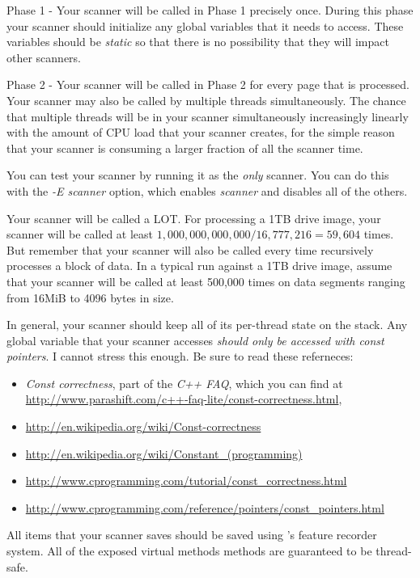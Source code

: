 Phase 1 - Your scanner will be called in Phase 1 precisely
once. During this phase your scanner should initialize any global
variables that it needs to access. These variables should be
\emph{static} so that there is no possibility that they will impact
other scanners.

Phase 2 - Your scanner will be called in Phase 2 for every page that
is processed. Your scanner may also be called by multiple threads
simultaneously. The chance that multiple
threads will be in your scanner simultaneously increasingly linearly
with the amount of CPU load that your scanner creates, for the simple
reason that your scanner is consuming a larger fraction of all the
scanner time. 

You can test your scanner by running it as the \emph{only}
scanner. You can do this with the \emph{-E scanner} option, which
enables \emph{scanner} and disables all of the others.

Your scanner will be called a LOT. For processing a 1TB drive image,
your scanner will be called at least $1,000,000,000,000 / 16,777,216 =
59,604$ times. But remember that your scanner will also be called
every time \bulk recursively processes a block of data. In a typical
run against a 1TB drive image, assume that your scanner will be called
at least 500,000 times on data segments ranging from 16MiB to 4096
bytes in size.

In general, your scanner should keep all of its per-thread state on
the stack. Any global variable that your scanner accesses \emph{should
only be accessed with const pointers}. I cannot stress this
enough. Be sure to read these referneces:

\begin{itemize}
\item \emph{Const correctness}, part of the \emph{C++ FAQ}, which you can find at
   \url{http://www.parashift.com/c++-faq-lite/const-correctness.html}, 
\item \url{http://en.wikipedia.org/wiki/Const-correctness}
\item \url{http://en.wikipedia.org/wiki/Constant_(programming)}
\item \url{http://www.cprogramming.com/tutorial/const_correctness.html}
\item
  \url{http://www.cprogramming.com/reference/pointers/const_pointers.html}
\end{itemize}

All items that your scanner saves should be saved using \bulk's
feature recorder system. All of the exposed virtual methods methods
are guaranteed to be thread-safe.

